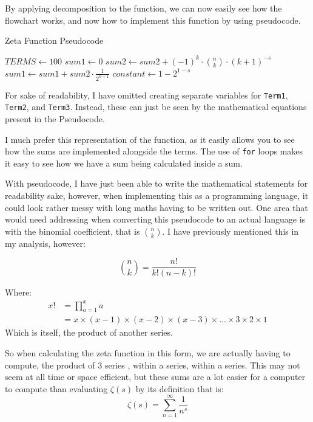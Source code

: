 \documentclass{article}
\begin{document}
By applying decomposition to the function, we can now easily see how the flowchart works, and now how to implement this function by using pseudocode.
\clearpage
\begin{algorithm}[h]
    \caption{Zeta Function Pseudocode}
    \begin{algorithmic}
            \State $TERMS \gets 100$
                \State \Return {$\infty$}
            \Else
                    \State $sum1 \gets 0$
                        \State $sum2 \gets sum2 + (-1)^k \cdot \binom{n}{k} \cdot (k+1)^{-s}$
                    \EndFor
                    \State $sum1 \gets sum1 + sum2 \cdot \frac{1}{2^{n+1}}$
                \EndFor
                \State $constant \gets 1-2^{1-s}$
                \State {}
            \EndIf
        \EndFunction
    \end{algorithmic}
\end{algorithm}

For sake of readability, I have omitted creating separate variables for \texttt{Term1}, \texttt{Term2}, and \texttt{Term3}. Instead, these can just be seen by the mathematical equations present in the Pseudocode.

I much prefer this representation of the function, as it easily allows you to see how the sums are implemented alongside the terms. The use of \texttt{for} loops makes it easy to see how we have a sum being calculated inside a sum.

With pseudocode, I have just been able to write the mathematical statements for readability sake, however, when implementing this as a programming language, it could look rather messy with long maths having to be written out.
One area that would need addressing when converting this pseudocode to an actual language is with the binomial coefficient, that is $\binom{n}{k}$. I have previously mentioned this in my analysis, however:

$$\binom{n}{k} = \frac{n!}{k!(n-k)!}$$

Where:
\begin{align*}
    x! &= \prod_{a=1}^x a\\
    &= x \times (x-1) \times (x-2) \times (x-3) \times \dots \times 3 \times 2 \times 1
\end{align*}
Which is itself, the product of another series.

So when calculating the zeta function in this form, we are actually having to compute, the product of 3 series , within a series, within a series. This may not seem at all time or space efficient, but these sums are a lot easier for a computer to compute than evaluating $\zeta(s)$ by its definition that is:
$$\zeta(s) = \sum^{\infty}_{n=1} \frac{1}{n^s}$$
\end{document}
